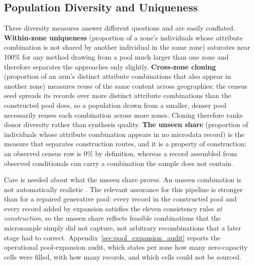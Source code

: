 \documentclass[review]{elsarticle}
\begin{document}
\FloatBarrier

\subsection{Population Diversity and Uniqueness}
\label{sec:diversity}
Three diversity measures answer different questions and are easily conflated. \textbf{Within-zone uniqueness} (proportion of a zone's individuals whose attribute combination is not shared by another individual in the same zone) saturates near 100\% for any method drawing from a pool much larger than one zone and therefore separates the approaches only slightly. \textbf{Cross-zone cloning} (proportion of an arm's distinct attribute combinations that also appear in another zone) measures reuse of the same content across geographies; the census seed spreads its records over more distinct attribute combinations than the constructed pool does, so a population drawn from a smaller, denser pool necessarily reuses each combination across more zones. Cloning therefore ranks donor diversity rather than synthesis quality. \textbf{The unseen share} (proportion of individuals whose attribute combination appears in no microdata record) is the measure that separates construction routes, and it is a property of construction: an observed census row is 0\% by definition, whereas a record assembled from observed conditionals can carry a combination the sample does not contain.

Care is needed about what the unseen share proves. An unseen combination is not automatically realistic \citep{Kim2023ASynthesis}. The relevant assurance for this pipeline is stronger than for a repaired generative pool: every record in the constructed pool and every record added by expansion satisfies the eleven consistency rules \emph{at construction}, so the unseen share reflects feasible combinations that the microsample simply did not capture, not arbitrary recombinations that a later stage had to correct. Appendix~\ref{sec:pool_expansion_audit} reports the operational pool-expansion audit, which states per zone how many zero-capacity cells were filled, with how many records, and which cells could not be sourced.


\FloatBarrier
\end{document}
